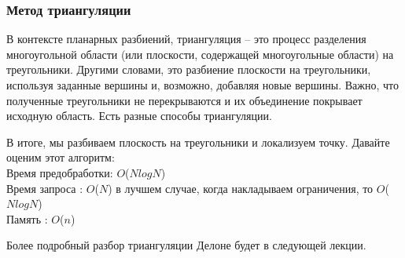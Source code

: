 \subsubsection*{Метод триангуляции}

\par В контексте планарных разбиений, триангуляция – это процесс разделения многоугольной области (или плоскости, содержащей многоугольные области) на треугольники. Другими словами, это разбиение плоскости на треугольники, используя заданные вершины и, возможно, добавляя новые вершины. Важно, что полученные треугольники не перекрываются и их объединение покрывает исходную область. Есть разные способы триангуляции.
\par В итоге, мы разбиваем плоскость на треугольники и локализуем точку. Давайте оценим этот алгоритм: \\
Время предобработки:  $O$($NlogN$) \\
Время запроса :  $O$($N$) в лучшем случае, когда накладываем ограничения, то $O$($NlogN$)  \\
Память : $O$($n$)

Более подробный разбор триангуляции Делоне будет в следующей лекции.

